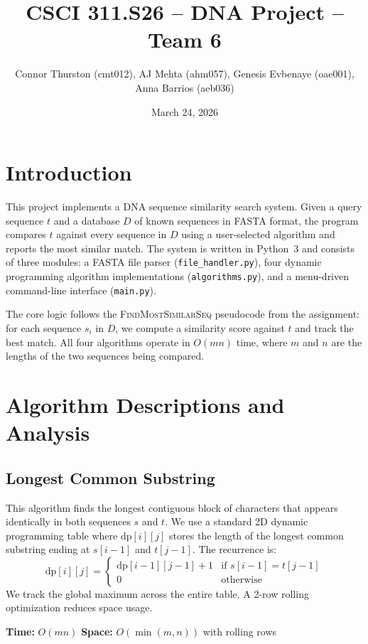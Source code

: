 \documentclass{article}
\title{CSCI 311.S26 -- DNA Project -- Team 6}
\author{Connor Thurston (cmt012), AJ Mehta (ahm057), Genesis Evbenaye (oae001), Anna Barrios (aeb036)}
\date{March 24, 2026}
\begin{document}
\maketitle

\section{Introduction}

This project implements a DNA sequence similarity search system. Given a query sequence $t$ and a database $D$ of known sequences in FASTA format, the program compares $t$ against every sequence in $D$ using a user-selected algorithm and reports the most similar match. The system is written in Python~3 and consists of three modules: a FASTA file parser (\texttt{file\_handler.py}), four dynamic programming algorithm implementations (\texttt{algorithms.py}), and a menu-driven command-line interface (\texttt{main.py}).

The core logic follows the \textsc{FindMostSimilarSeq} pseudocode from the assignment: for each sequence $s_i$ in $D$, we compute a similarity score against $t$ and track the best match. All four algorithms operate in $O(mn)$ time, where $m$ and $n$ are the lengths of the two sequences being compared.

\section{Algorithm Descriptions and Analysis}

\subsection{Longest Common Substring}

This algorithm finds the longest contiguous block of characters that appears identically in both sequences $s$ and $t$. We use a standard 2D dynamic programming table where $\text{dp}[i][j]$ stores the length of the longest common substring ending at $s[i{-}1]$ and $t[j{-}1]$. The recurrence is:
\[
\text{dp}[i][j] = 
\begin{cases}
\text{dp}[i{-}1][j{-}1] + 1 & \text{if } s[i{-}1] = t[j{-}1] \\
0 & \text{otherwise}
\end{cases}
\]
We track the global maximum across the entire table. A 2-row rolling optimization reduces space usage.

\textbf{Time:} $O(mn)$ \quad \textbf{Space:} $O(\min(m, n))$ with rolling rows
\end{document}
